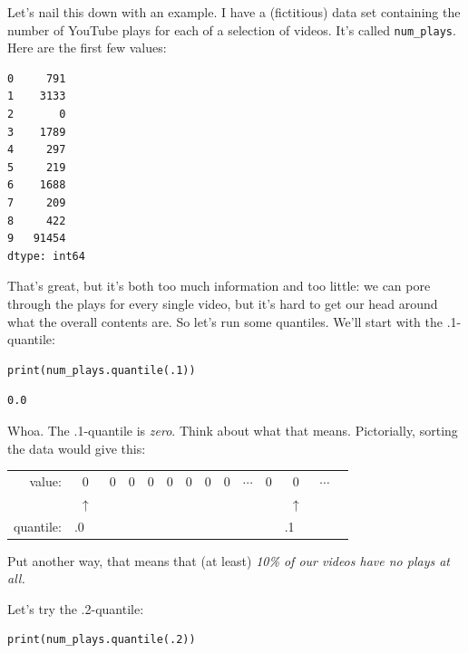 
Let's nail this down with an example. I have a (fictitious) data set containing
the number of YouTube plays for each of a selection of videos. It's called
\texttt{num\_plays}. Here are the first few values:

\begin{Verbatim}[fontsize=\small,samepage=true,frame=leftline,framesep=5mm,framerule=1mm]
0     791
1    3133
2       0
3    1789
4     297
5     219
6    1688
7     209
8     422
9   91454
dtype: int64
\end{Verbatim}

That's great, but it's both too much information and too little: we can pore
through the plays for every single video, but it's hard to get our head around
what the overall contents are. So let's run some quantiles. We'll start with
the .1-quantile:

\begin{Verbatim}[fontsize=\small,samepage=true,frame=single,framesep=3mm]
print(num_plays.quantile(.1))
\end{Verbatim}
\vspace{-.3in}

\begin{Verbatim}[fontsize=\small,samepage=true,frame=leftline,framesep=5mm,framerule=1mm]
0.0
\end{Verbatim}

\label{pointOneQuantileEpiphany}
Whoa. The .1-quantile is \textit{zero}. Think about what that means.
Pictorially, sorting the data would give this:

\begin{center}
\renewcommand{\arraystretch}{.7}
\begin{tabular}{rccccccccccccc}
value: & 0& 0& 0& 0& 0& 0& 0& 0& $\cdots$ & 0 & 0 & $\cdots$ \\
& $\uparrow$ & & & & & & & & & & $\uparrow$ & \\
quantile: & .0\ \ & & & & & & & & & & .1\ \ & \\
\end{tabular}
\end{center}

Put another way, that means that (at least) \textit{10\% of our videos have no
plays at all.}

Let's try the .2-quantile:

\begin{Verbatim}[fontsize=\small,samepage=true,frame=single,framesep=3mm]
print(num_plays.quantile(.2))
\end{Verbatim}
\vspace{-.3in}

